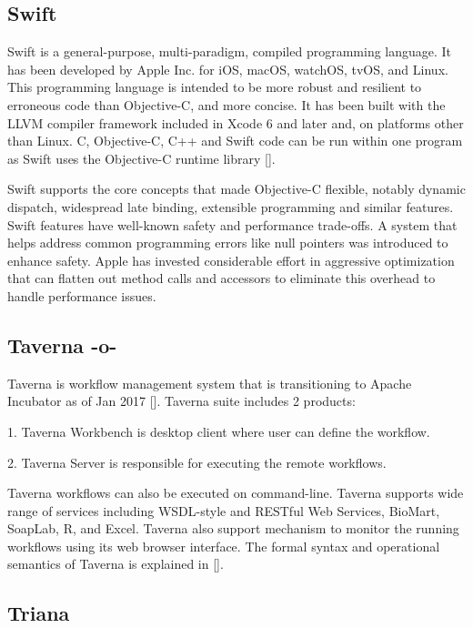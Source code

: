 \subsection{Swift}

Swift is a general-purpose, multi-paradigm, compiled programming
language. It has been developed by Apple Inc. for iOS, macOS, watchOS,
tvOS, and Linux. This programming language is intended to be more
robust and resilient to erroneous code than Objective-C, and more
concise. It has been built with the LLVM compiler framework included
in Xcode 6 and later and, on platforms other than Linux. C,
Objective-C, C++ and Swift code can be run within one program as Swift
uses the Objective-C runtime library [\cite{www-swift-wikipedia}].

Swift supports the core concepts that made Objective-C flexible,
notably dynamic dispatch, widespread late binding, extensible
programming and similar features. Swift features have well-known
safety and performance trade-offs. A system that helps address common
programming errors like null pointers was introduced to enhance
safety. Apple has invested considerable effort in aggressive
optimization that can flatten out method calls and accessors to
eliminate this overhead to handle performance issues.
      
\subsection{Taverna -o-}

Taverna is workflow management system that is transitioning to Apache
Incubator as of Jan 2017 [\cite{www-taverna}]. Taverna suite includes 2
products:

1. Taverna Workbench is desktop client where user can define the
workflow.

2. Taverna Server is responsible for executing the remote workflows.


Taverna workflows can also be executed on command-line.  Taverna
supports wide range of services including WSDL-style and RESTful
Web Services, BioMart, SoapLab, R, and Excel. Taverna also
support mechanism to monitor the running workflows using its web
browser interface. The formal syntax and operational semantics
of Taverna is explained in [\cite{taverna-paper}].



\subsection{Triana}

